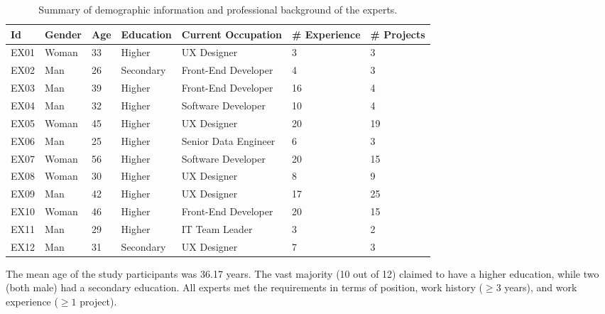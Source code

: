\documentclass[preprint,12pt,number]{elsarticle}
\begin{document}
\begin{table*}[h]
\caption{Summary of demographic information and professional background of the experts.}
\label{tab:sample-desc}
\centering
\footnotesize	
\begin{tabular}{|l|l|l|l|l|l|l|}
\hline
\textbf{Id} & \textbf{Gender}  & \textbf{Age} & \textbf{Education} & \textbf{Current Occupation}  & \textbf{\# Experience} & \textbf{\# Projects} \\ \hline
EX01      & Woman & 33  & Higher    & UX Designer                & 3          & 3        \\ \hline
EX02      & Man   & 26  & Secondary & Front-End Developer        & 4          & 3        \\ \hline
EX03      & Man   & 39  & Higher    & Front-End Developer        & 16         & 4        \\ \hline
EX04      & Man   & 32  & Higher    & Software Developer         & 10         & 4        \\ \hline
EX05      & Woman & 45  & Higher    & UX Designer                & 20         & 19       \\ \hline
EX06      & Man   & 25  & Higher    & Senior Data Engineer       & 6          & 3        \\ \hline
EX07      & Woman & 56  & Higher    & Software Developer         & 20         & 15       \\ \hline
EX08      & Woman & 30  & Higher    & UX Designer                & 8          & 9        \\ \hline
EX09      & Man   & 42  & Higher    & UX Designer                & 17         & 25       \\ \hline
EX10      & Woman & 46  & Higher    & Front-End Developer        & 20         & 15       \\ \hline
EX11      & Man   & 29  & Higher    & IT Team Leader             & 3          & 2        \\ \hline
EX12      & Man   & 31  & Secondary & UX Designer                & 7          & 3        \\ \hline
\end{tabular}
\end{table*}

The mean age of the study participants was 36.17 years. The vast majority (10 out of 12) claimed to have a higher education, while two (both male) had a secondary education. All experts met the requirements in terms of position, work history ($\geq 3$ years), and work experience ($\geq 1$ project). 
\end{document}
